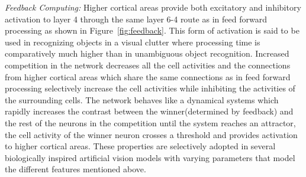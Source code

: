 \documentclass[12pt,twoside]{article}
\theoremstyle{plain}
\theoremstyle{definition}
\theoremstyle{remark}
\begin{document}
\textit{Feedback Computing: }Higher cortical areas provide both excitatory and inhibitory activation to layer 4 through the same layer 6-4 route as in feed forward processing as shown in Figure~\ref{fig:feedback}. This form of activation is said to be used in recognizing objects in a visual clutter where processing time is comparatively much higher than in unambiguous object recognition. Increased competition in the network decreases all the cell activities and the connections from higher cortical areas which share the same connections as in feed forward processing selectively increase the cell activities while inhibiting the activities of the surrounding cells. The network behaves like a dynamical systems which rapidly increases the contrast between the winner(determined by feedback) and the rest of the neurons in the competition until the system reaches an attractor, the cell activity of the winner neuron crosses a threshold and provides activation to higher cortical areas. These properties are selectively adopted in several biologically inspired artificial vision models\cite{Fukushim1980}\cite{JimMutch2008}\cite{MarkusLessmann2014}\cite{NicolasPinto2008}\cite{ThomasSerre2007}\cite{XiaolinHu2014} with varying parameters that model the different features mentioned above.
\end{document}
